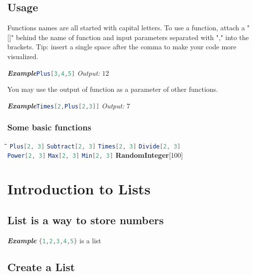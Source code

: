 \documentclass[10pt]{book}
\begin{document}
\section{Usage}
Functions names are all started with capital letters. To use a function, attach a "[]" behind the name of function and input parameters separated with "," into the brackets. Tip: insert a single space after the comma to make your code more visualized.

\noindent\emph{\textbf{Example}}\quad \lstinline[language=Mathematica]|Plus[3,4,5]| \hspace{\fill}\emph{Output:} $12$

\noindent You may use the output of function as a parameter of other functions.

\noindent\emph{\textbf{Example}}\quad \lstinline[language=Mathematica]|Times[2,Plus[2,3]]| \hspace{\fill}\emph{Output:} $7$



\subsection{Some basic functions}
\begin{tabbing}
\hspace{0.25\linewidth}\=\hspace{0.25\linewidth}\=\hspace{0.25\linewidth}\=\kill
\lstinline[language=Mathematica]|Plus[2, 3]| \> \lstinline[language=Mathematica]|Subtract[2, 3]| \> \lstinline[language=Mathematica]|Times[2, 3]| \> \lstinline[language=Mathematica]|Divide[2, 3]| \\
\lstinline[language=Mathematica]|Power[2, 3]| \> \lstinline[language=Mathematica]|Max[2, 3]| \> \lstinline[language=Mathematica]|Min[2, 3]| \> \textbf{RandomInteger}[100] \\ 
\end{tabbing} 
\chapter{Introduction to Lists}
\section{List is a way to store numbers}
\emph{\textbf{Example}}\quad
\lstinline[language=Mathematica]|{1,2,3,4,5}| is a list
\section{Create a List}
\end{document}

